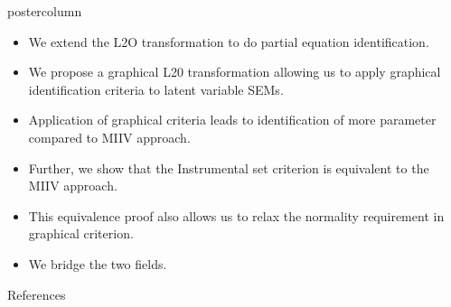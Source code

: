 \documentclass{beamer}
\begin{document}
\begin{frame}
\begin{columns}
\begin{column}{0.33\textwidth}
\begin{beamercolorbox}[center]{postercolumn}
\begin{minipage}{.98\textwidth}
{\begin{myblock}{}
	\end{myblock}\vfill
	\begin{myblock}{}
		\begin{itemize}
			\item \justifying We extend the L2O transformation to do partial equation identification.
			\item \justifying We propose a graphical L20 transformation allowing us to apply graphical identification criteria to latent variable SEMs.
			\item \justifying Application of graphical criteria leads to identification of more parameter compared to MIIV approach.
			\item \justifying Further, we show that the Instrumental set criterion is equivalent to the MIIV approach.
			\item \justifying This equivalence proof also allows us to relax the normality requirement in graphical criterion.
			\item \justifying We bridge the two fields.
		\end{itemize}
	\end{myblock}\vfill
	\begin{myblock}{References}
		\footnotesize
		
		
	\end{myblock}\vfill
		}\end{minipage}\end{beamercolorbox}
	\end{column}
\end{columns}
\end{frame}
\end{document}
